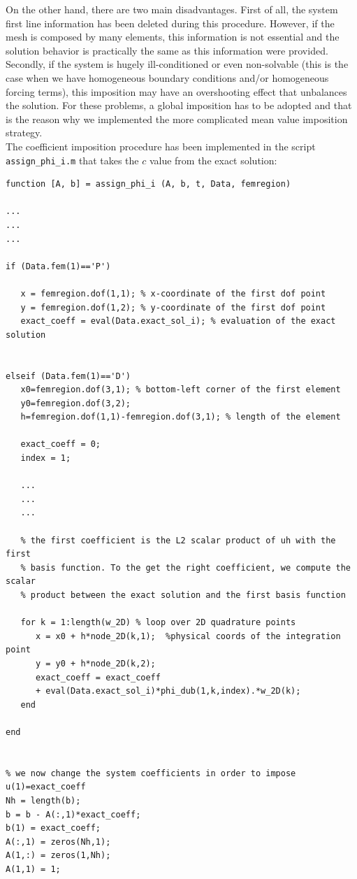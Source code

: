 \documentclass[a4paper,11pt]{article}
\begin{document}
\noindent On the other hand, there are two main disadvantages. First of all, the system first line information has been deleted during this procedure. However, if the mesh is composed by many elements, this information is not essential and the solution behavior is practically the same as this information were provided. \\
Secondly, if the system is hugely ill-conditioned or even non-solvable (this is the case when we have homogeneous boundary conditions and/or homogeneous forcing terms), this imposition may have an overshooting effect that unbalances the solution. For these problems, a global imposition has to be adopted and that is the reason why we implemented the more complicated mean value imposition strategy.\\

\noindent The coefficient imposition procedure has been implemented in the script \texttt{assign\_phi\_i.m} that takes the $c$ value from the exact solution: \\

\begin{verbatim}
function [A, b] = assign_phi_i (A, b, t, Data, femregion)

...
...
...

if (Data.fem(1)=='P')

   x = femregion.dof(1,1); % x-coordinate of the first dof point
   y = femregion.dof(1,2); % y-coordinate of the first dof point
   exact_coeff = eval(Data.exact_sol_i); % evaluation of the exact solution


elseif (Data.fem(1)=='D')
   x0=femregion.dof(3,1); % bottom-left corner of the first element
   y0=femregion.dof(3,2);
   h=femregion.dof(1,1)-femregion.dof(3,1); % length of the element

   exact_coeff = 0;
   index = 1;
   
   ...
   ...
   ...

   % the first coefficient is the L2 scalar product of uh with the first
   % basis function. To the get the right coefficient, we compute the scalar 
   % product between the exact solution and the first basis function
   
   for k = 1:length(w_2D) % loop over 2D quadrature points
      x = x0 + h*node_2D(k,1);  %physical coords of the integration point
      y = y0 + h*node_2D(k,2);
      exact_coeff = exact_coeff 
      + eval(Data.exact_sol_i)*phi_dub(1,k,index).*w_2D(k);
   end

end


% we now change the system coefficients in order to impose u(1)=exact_coeff
Nh = length(b);
b = b - A(:,1)*exact_coeff;
b(1) = exact_coeff;  
A(:,1) = zeros(Nh,1);
A(1,:) = zeros(1,Nh);
A(1,1) = 1;

\end{verbatim}
\end{document}
